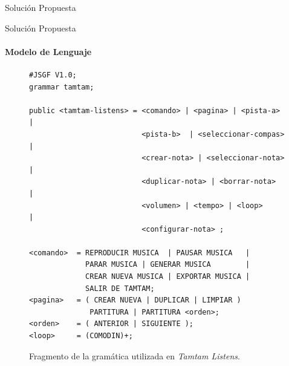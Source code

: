 \begin{frame}{Soluci\'on Propuesta}

\end{frame}

\begin{frame}[fragile]{Soluci\'on Propuesta}
\framesubtitle{Modelo de Lenguaje}
\begin{figure}[H]
\lstset{basicstyle=\ttfamily\scriptsize}
\begin{lstlisting}
#JSGF V1.0;
grammar tamtam;

public <tamtam-listens> = <comando> | <pagina> | <pista-a>  |
                          <pista-b>  | <seleccionar-compas> | 
                          <crear-nota> | <seleccionar-nota> | 
                          <duplicar-nota> | <borrar-nota>   | 
                          <volumen> | <tempo> | <loop>      |
                          <configurar-nota> ;

<comando>  = REPRODUCIR MUSICA  | PAUSAR MUSICA   |
             PARAR MUSICA | GENERAR MUSICA        | 
             CREAR NUEVA MUSICA | EXPORTAR MUSICA | 
             SALIR DE TAMTAM;
<pagina>   = ( CREAR NUEVA | DUPLICAR | LIMPIAR ) 
              PARTITURA | PARTITURA <orden>;
<orden>    = ( ANTERIOR | SIGUIENTE );
<loop>     = (COMODIN)+;
\end{lstlisting}
\caption{Fragmento de la gram\'atica utilizada en \emph{Tamtam Listens}.}
\label{figure:fragmento-gram}
\end{figure} 
\end{frame}

